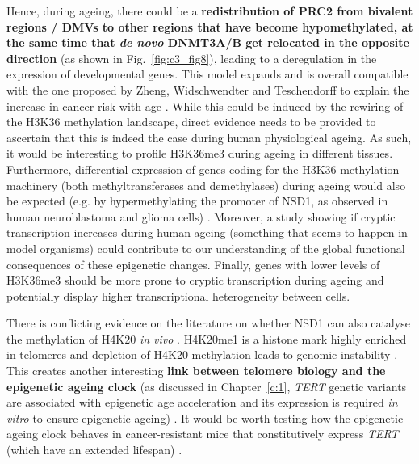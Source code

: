 Hence, during ageing, there could be a  \textbf{redistribution of \acrshort{PRC2} from bivalent regions / \acrshort{DMV}s to other regions that have become hypomethylated, at the same time that \textit{de novo} DNMT3A/B get relocated in the opposite direction} (as shown in Fig.~\ref{fig:c3_fig8}), leading to a deregulation in the expression of developmental genes. This model expands and is overall compatible with the one proposed by Zheng, Widschwendter and Teschendorff to explain the increase in cancer risk with age \citep{Zheng2016}. While this could be induced by the rewiring of the H3K36 methylation landscape, direct evidence needs to be provided to ascertain that this is indeed the case during human physiological ageing. As such, it would be interesting to profile H3K36me3 during ageing in different tissues. Furthermore, differential expression of genes coding for the H3K36 methylation machinery (both methyltransferases and demethylases) during ageing would also be expected (e.g. by hypermethylating the promoter of NSD1, as observed in human neuroblastoma and glioma cells) \citep{Berdasco2009}. Moreover, a study showing if cryptic transcription increases during human ageing (something that seems to happen in model organisms) could contribute to our understanding of the global functional consequences of these epigenetic changes. Finally, genes with lower levels of H3K36me3 should be more prone to cryptic transcription during ageing \citep{Pu2015} and potentially display higher transcriptional heterogeneity between cells. 

\bigskip

There is conflicting evidence on the literature on whether NSD1 can also catalyse the methylation of H4K20 \textit{in vivo} \citep{Berdasco2009,Kudithipudi2014}. H4K20me1 is a histone mark highly enriched in telomeres \citep{Enguix2018} and depletion of H4K20 methylation leads to genomic instability \citep{Sorensen2013}. This creates another interesting \textbf{link between telomere biology and the epigenetic ageing clock} (as discussed in Chapter~\ref{c:1}, \textit{TERT} genetic variants are associated with epigenetic age acceleration and its expression is required \textit{in vitro} to ensure epigenetic ageing) \citep{Lu2018}. It would be worth testing how the epigenetic ageing clock behaves in cancer-resistant mice that constitutively express \textit{TERT} (which have an extended lifespan) \citep{Tomas-Loba2008}. 

\bigskip

